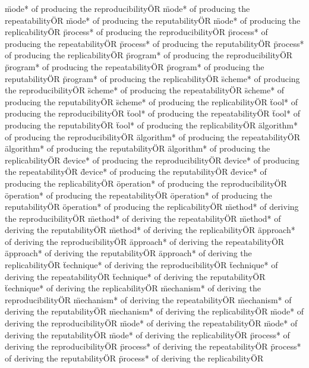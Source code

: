 \documentclass[
10pt, %
a4paper, %
oneside, %
headinclude,footinclude, %
BCOR5mm, %
]{scrartcl}
\begin{document}
\"mode* of producing the reproducibility\" OR \"mode* of producing the repeatability\" OR \"mode* of producing the reputability\" OR \"mode* of producing the replicability\" OR 
\"process* of producing the reproducibility\" OR \"process* of producing the repeatability\" OR \"process* of producing the reputability\" OR \"process* of producing the replicability\" OR 
\"program* of producing the reproducibility\" OR \"program* of producing the repeatability\" OR \"program* of producing the reputability\" OR \"program* of producing the replicability\" OR 
\"scheme* of producing the reproducibility\" OR \"scheme* of producing the repeatability\" OR \"scheme* of producing the reputability\" OR \"scheme* of producing the replicability\" OR 
\"tool* of producing the reproducibility\" OR \"tool* of producing the repeatability\" OR \"tool* of producing the reputability\" OR \"tool* of producing the replicability\" OR 
\"algorithm* of producing the reproducibility\" OR \"algorithm* of producing the repeatability\" OR \"algorithm* of producing the reputability\" OR \"algorithm* of producing the replicability\" OR 
\"device* of producing the reproducibility\" OR \"device* of producing the repeatability\" OR \"device* of producing the reputability\" OR \"device* of producing the replicability\" OR 
\"operation* of producing the reproducibility\" OR \"operation* of producing the repeatability\" OR \"operation* of producing the reputability\" OR \"operation* of producing the replicability\" OR 
\"method* of deriving the reproducibility\" OR \"method* of deriving the repeatability\" OR \"method* of deriving the reputability\" OR \"method* of deriving the replicability\" OR 
\"approach* of deriving the reproducibility\" OR \"approach* of deriving the repeatability\" OR \"approach* of deriving the reputability\" OR \"approach* of deriving the replicability\" OR 
\"technique* of deriving the reproducibility\" OR \"technique* of deriving the repeatability\" OR \"technique* of deriving the reputability\" OR \"technique* of deriving the replicability\" OR 
\"mechanism* of deriving the reproducibility\" OR \"mechanism* of deriving the repeatability\" OR \"mechanism* of deriving the reputability\" OR \"mechanism* of deriving the replicability\" OR 
\"mode* of deriving the reproducibility\" OR \"mode* of deriving the repeatability\" OR \"mode* of deriving the reputability\" OR \"mode* of deriving the replicability\" OR 
\"process* of deriving the reproducibility\" OR \"process* of deriving the repeatability\" OR \"process* of deriving the reputability\" OR \"process* of deriving the replicability\" OR 
\end{document}
